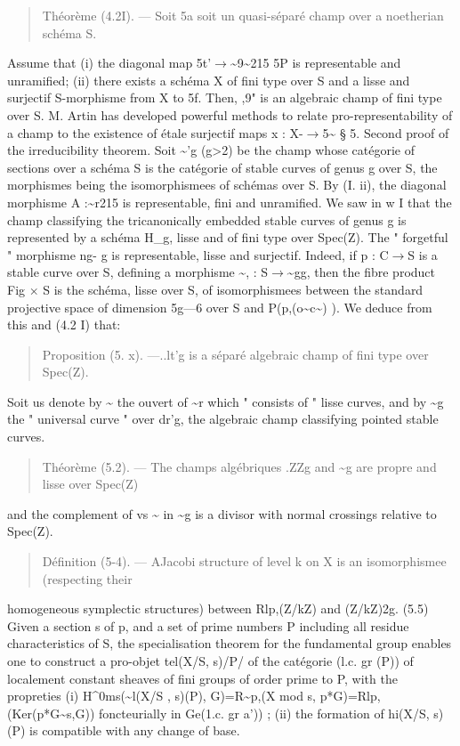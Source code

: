 \documentclass[11pt]{article}
\theoremstyle{plain}
\theoremstyle{definition}
\theoremstyle{remark}
\begin{document}
\begin{quote}Th\'eor\`eme (4.2I). --- Soit 5a soit un quasi-s\'epar\'e champ over a noetherian sch\'ema S.\end{quote}
Assume that (i) the diagonal map 5t'$\to$\textasciitilde{}9\textasciitilde{}215 5P is representable and unramified; (ii) there exists a sch\'ema X of fini type over S and a lisse and surjectif S-morphisme from X to 5f. Then, ,9" is an algebraic champ of fini type over S. M. Artin has developed powerful methods to relate pro-representability of a champ to the existence of \'etale surjectif maps x : X-$\to$5\textasciitilde{} § 5. Second proof of the irreducibility theorem. Soit \textasciitilde{}'g (g>2) be the champ whose cat\'egorie of sections over a sch\'ema S is the cat\'egorie of stable curves of genus g over S, the morphismes being the isomorphismees of sch\'emas over S. By (I. ii), the diagonal morphisme A :\textasciitilde{}r215 is representable, fini and unramified. We saw in w I that the champ classifying the tricanonically embedded stable curves of genus g is represented by a sch\'ema H\_g, lisse and of fini type over Spec(Z). The " forgetful " morphisme ng- g is representable, lisse and surjectif. Indeed, if p : C$\to$S is a stable curve over S, defining a morphisme \textasciitilde{}, : S$\to$\textasciitilde{}gg, then the fibre product Fig $\times$ S is the sch\'ema, lisse over S, of isomorphismees between the standard projective space of dimension 5g---6 over S and P(p,(o\textasciitilde{}c\textasciitilde{}) ). We deduce from this and (4.2 I) that:

\begin{quote}Proposition (5. x). ---..lt'g is a s\'epar\'e algebraic champ of fini type over Spec(Z).\end{quote}
Soit us denote by \textasciitilde{} the ouvert of \textasciitilde{}r which " consists of " lisse curves, and by \textasciitilde{}g the " universal curve " over dr'g, the algebraic champ classifying pointed stable curves.

\begin{quote}Th\'eor\`eme (5.2). --- The champs alg\'ebriques .ZZg and \textasciitilde{}g are propre and lisse over Spec(Z)\end{quote}
and the complement of vs \textasciitilde{} in \textasciitilde{}g is a divisor with normal crossings relative to Spec(Z).

\begin{quote}D\'efinition (5-4). --- AJacobi structure of level k on X is an isomorphismee (respecting their\end{quote}
homogeneous symplectic structures) between Rlp,(Z/kZ) and (Z/kZ)2g. (5.5) Given a section s of p, and a set of prime numbers P including all residue characteristics of S, the specialisation theorem for the fundamental group enables one to construct a pro-objet tel(X/S, s)/P/ of the cat\'egorie (l.c. gr (P)) of localement constant sheaves of fini groups of order prime to P, with the propreties (i) H\textasciicircum{}0ms(\textasciitilde{}l(X/S , s)(P), G)=R\textasciitilde{}p,(X mod s, p*G)=Rlp,(Ker(p*G\textasciitilde{}s,G)) foncteurially in Ge(1.c. gr a')) ; (ii) the formation of hi(X/S, s)(P) is compatible with any change of base.
\end{document}
